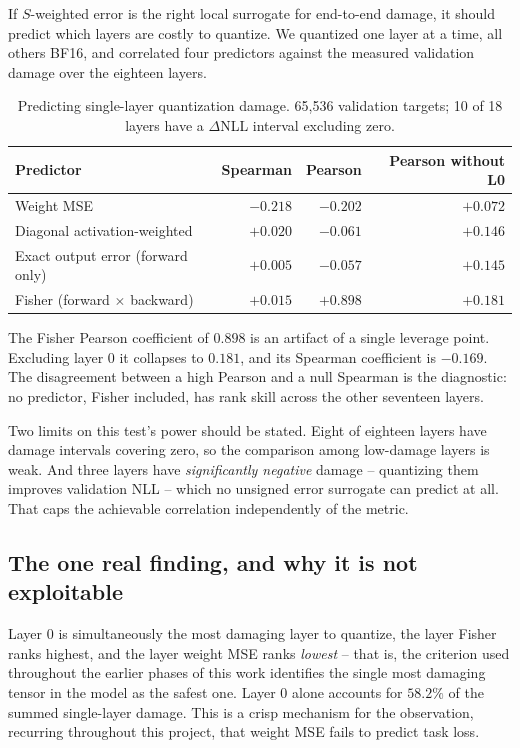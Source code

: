 If $S$-weighted error is the right local surrogate for end-to-end damage, it
should predict which layers are costly to quantize. We quantized one layer at a
time, all others BF16, and correlated four predictors against the measured
validation damage over the eighteen layers.

\begin{table}[ht]
\centering\small
\caption{Predicting single-layer quantization damage. 65{,}536 validation
targets; 10 of 18 layers have a $\Delta$NLL interval excluding zero.}
\label{tab:fisher}
\begin{tabular}{lrrr}\toprule
Predictor & Spearman & Pearson & Pearson without L0\\\midrule
Weight MSE & $-0.218$ & $-0.202$ & $+0.072$\\
Diagonal activation-weighted & $+0.020$ & $-0.061$ & $+0.146$\\
Exact output error (forward only) & $+0.005$ & $-0.057$ & $+0.145$\\
Fisher (forward $\times$ backward) & $+0.015$ & $+0.898$ & $+0.181$\\\bottomrule
\end{tabular}
\end{table}

The Fisher Pearson coefficient of $0.898$ is an artifact of a single leverage
point. Excluding layer 0 it collapses to $0.181$, and its Spearman coefficient
is $-0.169$. The disagreement between a high Pearson and a null Spearman is the
diagnostic: no predictor, Fisher included, has rank skill across the other
seventeen layers.

Two limits on this test's power should be stated. Eight of eighteen layers have
damage intervals covering zero, so the comparison among low-damage layers is
weak. And three layers have \emph{significantly negative} damage -- quantizing
them improves validation NLL -- which no unsigned error surrogate can predict at
all. That caps the achievable correlation independently of the metric.

\subsection{The one real finding, and why it is not exploitable}

Layer 0 is simultaneously the most damaging layer to quantize, the layer Fisher
ranks highest, and the layer weight MSE ranks \emph{lowest} -- that is, the
criterion used throughout the earlier phases of this work identifies the single
most damaging tensor in the model as the safest one. Layer 0 alone accounts for
$58.2\%$ of the summed single-layer damage. This is a crisp mechanism for the
observation, recurring throughout this project, that weight MSE fails to predict
task loss.

